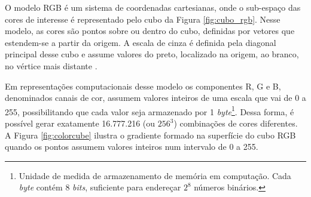 O modelo RGB é um sistema de coordenadas cartesianas, onde o sub-espaço das cores de interesse é representado pelo cubo da Figura \ref{fig:cubo_rgb}. Nesse modelo, as cores são pontos sobre ou dentro do cubo, definidas por vetores que estendem-se a partir da origem. A escala de cinza é definida pela diagonal principal desse cubo e assume valores do preto, localizado na origem, ao branco, no vértice mais distante \citep{woods:2000:book}.

Em representações computacionais desse modelo os componentes R, G e B, denominados canais de cor, assumem valores inteiros de uma escala que vai de 0 a 255, possibilitando que cada valor seja armazenado por 1 \textit{byte}\footnote{Unidade de medida de armazenamento de memória em computação. Cada \textit{byte} contém 8 \textit{bits}, suficiente para endereçar $2^8$ números binários.}. Dessa forma, é possível gerar exatamente 16.777.216 (ou $256^3$) combinações de cores diferentes. A Figura \ref{fig:colorcube} ilustra o gradiente formado na superfície do cubo RGB quando os pontos assumem valores inteiros num intervalo de 0 a 255.

